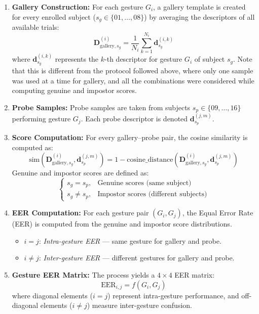 \begin{enumerate}[label=\textbf{Step \arabic*:}]
    \item \textbf{Gallery Construction:} For each gesture $G_i$, a gallery template is created for every enrolled subject ($s_g \in \{01,\dots,08\}$) by averaging the descriptors of all available trials:
    \[
        \mathbf{D}^{(i)}_{\text{gallery}, s_g} = \frac{1}{N_i} \sum_{k=1}^{N_i} \mathbf{d}^{(i,k)}_{s_g}
    \]
    where $\mathbf{d}^{(i,k)}_{s_g}$ represents the $k$-th descriptor for gesture $G_i$ of subject $s_g$. Note that this is different from the protocol followed above, where only one sample was used at a time for gallery, and all the combinations were considered while computing genuine and impostor scores. 

    \item \textbf{Probe Samples:} Probe samples are taken from subjects $s_p \in \{09,\dots,16\}$ performing gesture $G_j$. Each probe descriptor is denoted $\mathbf{d}^{(j,m)}_{s_p}$.

    \item \textbf{Score Computation:} For every gallery–probe pair, the cosine similarity is computed as:
    \[
        \text{sim}\left(\mathbf{D}^{(i)}_{\text{gallery}, s_g}, \mathbf{d}^{(j,m)}_{s_p}\right)
        = 1 - \text{cosine\_distance}\left(\mathbf{D}^{(i)}_{\text{gallery}, s_g}, \mathbf{d}^{(j,m)}_{s_p}\right)
    \]
    Genuine and impostor scores are defined as:
    \[
        \begin{cases}
        s_g = s_p, & \text{Genuine scores (same subject)}\\
        s_g \neq s_p, & \text{Impostor scores (different subjects)}
        \end{cases}
    \]

    \item \textbf{EER Computation:} For each gesture pair $(G_i, G_j)$, the Equal Error Rate (EER) is computed from the genuine and impostor score distributions.
    \begin{itemize}
        \item $i = j$: \textit{Intra-gesture EER} — same gesture for gallery and probe.
        \item $i \neq j$: \textit{Inter-gesture EER} — different gestures for gallery and probe.
    \end{itemize}

    \item \textbf{Gesture EER Matrix:} The process yields a $4 \times 4$ EER matrix:
    \[
        \text{EER}_{i,j} = f(G_i, G_j)
    \]
    where diagonal elements ($i=j$) represent intra-gesture performance, and off-diagonal elements ($i \neq j$) measure inter-gesture confusion.

\end{enumerate}


